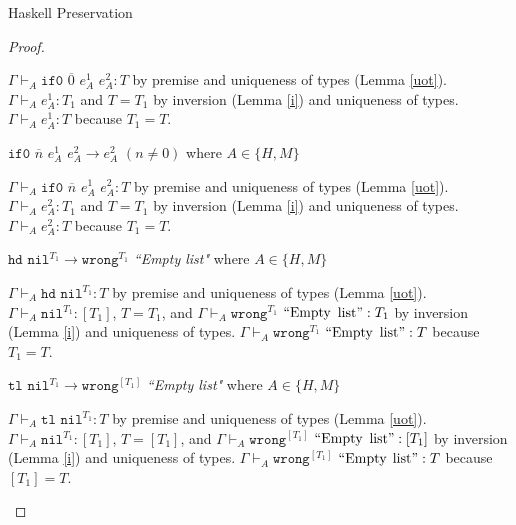 \begin{theorem}{Haskell Preservation}
\begin{proof}
\begin{case}{\osiftrue}
$\Gamma\vdash_{A}\mathtt{if0}$ $\overline{0}$ $e_{A}^{1}$ $e_{A}^{2}:T$ by premise and uniqueness of types (Lemma \ref{uot}).  $\Gamma\vdash_{A}e_{A}^{1}:T_{1}$ and $T=T_{1}$ by inversion (Lemma \ref{i}) and uniqueness of types.  $\Gamma\vdash_{A}e_{A}^{1}:T$ because $T_{1}=T$.
\end{case}


\begin{case}{\osiffalse}

$\mathtt{if0}$ $\overline{n}$ $e_{A}^{1}$ $e_{A}^{2}\rightarrow e_{A}^{2}$ $(n\neq0)$ where $A\in\lbrace H,M\rbrace$

$\Gamma\vdash_{A}\mathtt{if0}$ $\overline{n}$ $e_{A}^{1}$ $e_{A}^{2}:T$ by premise and uniqueness of types (Lemma \ref{uot}).  $\Gamma\vdash_{A}e_{A}^{2}:T_{1}$ and $T=T_{1}$ by inversion (Lemma \ref{i}) and uniqueness of types.  $\Gamma\vdash_{A}e_{A}^{2}:T$ because $T_{1}=T$.
\end{case}


\begin{case}{\oshdnil}

$\mathtt{hd}$ $\mathtt{nil}^{T_{1}}\rightarrow\mathtt{wrong}^{T_{1}}$ \emph{``Empty list"} where $A\in\lbrace H,M\rbrace$

$\Gamma\vdash_{A}\mathtt{hd}$ $\mathtt{nil}^{T_{1}}:T$ by premise and uniqueness of types (Lemma \ref{uot}).  $\Gamma\vdash_{A}\mathtt{nil}^{T_{1}}:[T_{1}]$, $T=T_{1}$, and $\Gamma\vdash_{A}\mathtt{wrong}^{T_{1}}$ $\mathrm{``Empty}$ $\mathrm{list"}:T_{1}$ by inversion (Lemma \ref{i}) and uniqueness of types.  $\Gamma\vdash_{A}\mathtt{wrong}^{T_{1}}$ $\mathrm{``Empty}$ $\mathrm{list"}:T$ because $T_{1}=T$.
\end{case}


\begin{case}{\ostlnil}

$\mathtt{tl}$ $\mathtt{nil}^{T_{1}}\rightarrow\mathtt{wrong}^{[T_{1}]}$ \emph{``Empty list"} where $A\in\lbrace H,M\rbrace$

$\Gamma\vdash_{A}\mathtt{tl}$ $\mathtt{nil}^{T_{1}}:T$ by premise and uniqueness of types (Lemma \ref{uot}).  $\Gamma\vdash_{A}\mathtt{nil}^{T_{1}}:[T_{1}]$, $T=[T_{1}]$, and $\Gamma\vdash_{A}\mathtt{wrong}^{[T_{1}]}$ $\mathrm{``Empty}$ $\mathrm{list"}:[T_{1}]$ by inversion (Lemma \ref{i}) and uniqueness of types.  $\Gamma\vdash_{A}\mathtt{wrong}^{[T_{1}]}$ $\mathrm{``Empty}$ $\mathrm{list"}:T$ because $[T_{1}]=T$.
\end{case}


\end{proof}
\end{theorem}
